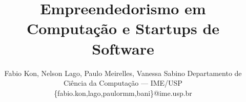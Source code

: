 \documentclass[brazil]{JAImod}
\begin{document}
\date{}

\title{Empreendedorismo em Computação e Startups de Software}

\author{Fabio Kon, Nelson Lago, Paulo Meirelles, Vanessa Sabino
Departamento de Ciência da Computação --- IME/USP
\{fabio.kon,lago,paulormm,bani\}@ime.usp.br
}

\maketitle













\end{document}
